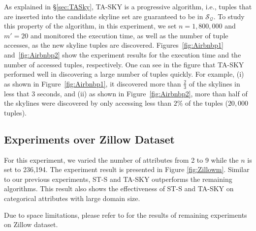 As explained in \S\ref{sec:TASky}, TA-SKY is a progressive algorithm, i.e., tuples that are inserted into the candidate skyline set are guaranteed to be in $\mathcal{S}_\mathcal{Q}$.
To study this property of the algorithm, in this experiment, we set $n=1,800,000$ and $m'=20$ and monitored the execution time, as well as the number of tuple accesses, as the new skyline tuples are discovered. 
Figures~\ref{fig:Airbnbp1} and~\ref{fig:Airbnbp2} show the experiment results for the execution time and the number of accessed tuples, respectively.
One can see in the figure that TA-SKY performed well in discovering a large number of tuples quickly. For example, (i) as shown in Figure~\ref{fig:Airbnbp1}, it discovered more than $\frac{2}{3}$ of the skylines in less that $3$ seconds, and (ii) as shown in Figure~\ref{fig:Airbnbp2}, more than half of the skylines were discovered by only accessing less than $2\%$ of the tuples ($20,000$ tuples).


\vspace{-2mm}
\subsection{Experiments over Zillow Dataset}\label{subsec:expZillow}


For this experiment, we varied the number of attributes from 2 to 9 while the $n$ is set to 236,194. The experiment result is presented in Figure \ref{fig:Zillowm}. Similar to our previous experiments, ST-S and TA-SKY outperforms the remaining algorithms. This result also shows the effectiveness of ST-S and TA-SKY on categorical attributes with large domain size.
 

Due to space limitations, please refer to \cite{TechReport} for the results of remaining experiments on Zillow dataset.